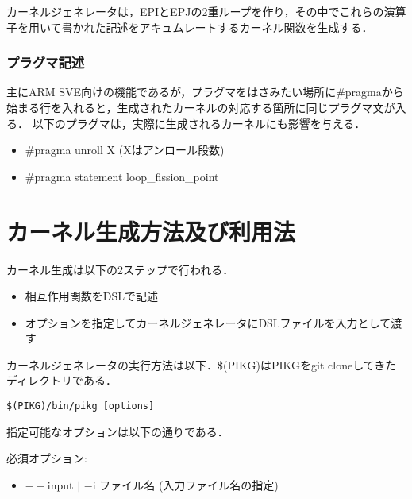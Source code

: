 \documentclass{article}
\begin{document}
カーネルジェネレータは，EPIとEPJの2重ループを作り，その中でこれらの演算子を用いて書かれた記述をアキュムレートするカーネル関数を生成する．

\subsubsection{プラグマ記述}
主にARM SVE向けの機能であるが，プラグマをはさみたい場所に\#pragmaから始まる行を入れると，生成されたカーネルの対応する箇所に同じプラグマ文が入る．
以下のプラグマは，実際に生成されるカーネルにも影響を与える．
 \begin{itemize}
  \item \#pragma unroll X (Xはアンロール段数)
  \item \#pragma statement loop\_fission\_point
 \end{itemize}


\section{カーネル生成方法及び利用法}
カーネル生成は以下の2ステップで行われる．
 \begin{itemize}
  \item 相互作用関数をDSLで記述
  \item オプションを指定してカーネルジェネレータにDSLファイルを入力として渡す
 \end{itemize}
 カーネルジェネレータの実行方法は以下．\$(PIKG)はPIKGをgit cloneしてきたディレクトリである．
\begin{verbatim}
$(PIKG)/bin/pikg [options]
\end{verbatim}

 指定可能なオプションは以下の通りである．
 
   必須オプション:
  \begin{itemize}
   \item $--$input $|$ $-$i ファイル名 (入力ファイル名の指定)
  \end{itemize}
\end{document}
